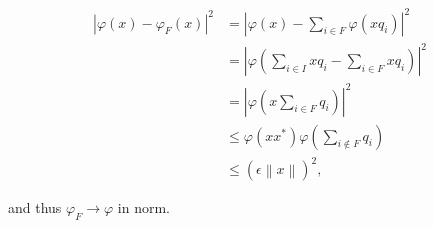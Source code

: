 \documentclass[a4paper,10pt]{report}
\begin{document}
\begin{enumerate}
		\begin{align*}
				\left| \varphi \left( x \right) - \varphi_F \left( x \right) \right|^2%
				&= \left| \varphi \left( x \right) - \sum_{i \in F} \varphi \left( x q_i \right) \right|^2\\
				&= \left| \varphi \left( \sum_{i \in I} x q_i - \sum_{i \in F} x q_i \right) \right|^2\\
				&= \left| \varphi \left( x \sum_{i \in F} q_i \right) \right|^2\\
				&\leq \varphi \left( x x^* \right) \varphi \left( \sum_{i \notin F} q_i \right)\\
				&\leq \left( \epsilon \left\| x \right\| \right)^2,
		\end{align*}

		and thus $\varphi_F \to \varphi$ in norm.\\
\end{enumerate}
\end{document}
